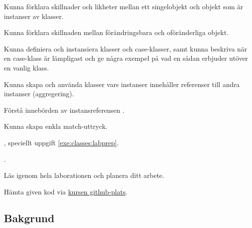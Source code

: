 

\Lab{\LabWeekSIX}

\begin{Goals}
\item Kunna förklara skillnader och likheter mellan ett singelobjekt och objekt som är instanser av klasser.
\item Kunna förklara skillnaden mellan förändringsbara och oföränderliga objekt.
\item Kunna definiera och instansiera klasser och case-klasser, samt kunna beskriva när en case-klass är lämpligast och ge några exempel på vad en sådan erbjuder utöver en vanlig klass.
\item Kunna skapa och använda klasser vars instanser innehåller referenser till andra instanser (aggregering).
\item Förstå innebörden av instansreferensen .
\item Kunna skapa enkla match-uttryck.
\end{Goals}

\begin{Preparations}
\item {}, speciellt uppgift \ref{exe:classes:labprep}.
\item {}.
\item Läs igenom hela laborationen och planera ditt arbete.
\item Hämta given kod via \href{https://github.com/lunduniversity/introprog/tree/master/workspace/}{kursen github-plats}.

\end{Preparations}

\subsection{Bakgrund}

